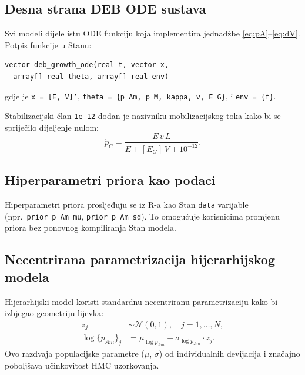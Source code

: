 \documentclass[11pt,a4paper]{article}
\newcommand{\code}[1]{\texttt{#1}}
\newcommand{\R}{\textsf{R}}
\begin{document}
\subsection{Desna strana DEB ODE sustava}

Svi modeli dijele istu ODE funkciju koja implementira jednadžbe
\eqref{eq:pA}--\eqref{eq:dV}.  Potpis funkcije u Stanu:

\begin{lstlisting}[style=Stanstyle]
vector deb_growth_ode(real t, vector x,
  array[] real theta, array[] real env)
\end{lstlisting}

gdje je \code{x = [E, V]'}, \code{theta = \{p\_Am, p\_M, kappa, v, E\_G\}},
i \code{env = \{f\}}.

Stabilizacijski član \code{1e-12} dodan je nazivniku mobilizacijskog
toka kako bi se spriječilo dijeljenje nulom:
\begin{equation}
\dot{p}_C = \frac{E\,v\,L}{E + [E_G]\,V + 10^{-12}}.
\end{equation}

\subsection{Hiperparametri priora kao podaci}

Hiperparametri priora prosljeđuju se iz \R-a kao Stan \code{data}
varijable (npr.\ \code{prior\_p\_Am\_mu}, \code{prior\_p\_Am\_sd}).  To
omogućuje korisnicima promjenu priora bez ponovnog kompiliranja Stan
modela.

\subsection{Necentrirana parametrizacija hijerarhijskog modela}

Hijerarhijski model koristi standardnu necentriranu parametrizaciju kako
bi izbjegao geometriju lijevka:
\begin{align}
  z_j &\sim \mathcal{N}(0, 1), \quad j = 1,\ldots,N, \\
  \log\{p_{Am}\}_j &= \mu_{\log p_{Am}} + \sigma_{\log p_{Am}} \cdot z_j.
\end{align}
Ovo razdvaja populacijske parametre ($\mu$, $\sigma$) od individualnih
devijacija i značajno poboljšava učinkovitost HMC uzorkovanja.
\end{document}
